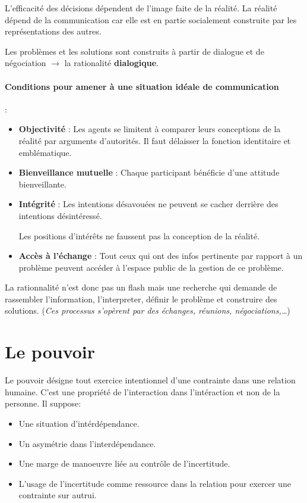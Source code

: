 \documentclass[11pt]{article} %
\begin{document}
L'efficacité des décisions dépendent de l'image faite de la
réalité. La réalité dépend de la communication car elle est
en partie socialement construite par les représentations des autres.

Les problèmes et les solutions sont construits à partir de
dialogue et de négociation $\to$ la rationalité \textbf{dialogique}.

\paragraph{Conditions pour amener à une situation idéale de
communication} :

\begin{itemize}
 \item \textbf{Objectivité} : Les agents se limitent à comparer leurs
 conceptions de la réalité par arguments d'autorités. Il faut
 délaisser la fonction identitaire et emblématique.

 \item \textbf{Bienveillance mutuelle} : Chaque participant bénéficie d'une
attitude bienveillante.

 \item \textbf{Intégrité} : Les intentions désavouées ne peuvent se
 cacher derrière des intentions désintéressé.

 Les positions d'intérêts ne faussent pas la conception de la
 réalité.

 \item \textbf{Accès à l'échange} : Tout ceux qui ont des infos pertinente
 par rapport à un problème peuvent accéder à l'espace public de la
 gestion de ce problème.
\end{itemize}

La rationnalité n'est donc pas un flash mais une recherche qui demande
de rassembler l'information, l'interpreter, définir le problème et
construire des solutions. (\textit{Ces processus s'opèrent par des
échanges, réunions, négociations,\ldots})
	

\section{Le pouvoir}
	Le pouvoir désigne tout exercice intentionnel d'une contrainte dans une relation humaine. C'est une
	propriété de l'interaction dans l'intéraction et non de la personne. Il suppose:
	\begin{itemize}
		\item Une situation d'intérdépendance.
		\item Un asymétrie dans l'interdépendance.
		\item Une marge de manoeuvre liée au contrôle de l'incertitude.
		\item L'usage de l'incertitude comme ressource dans la relation pour exercer une contrainte sur autrui.
	\end{itemize}
\end{document}
